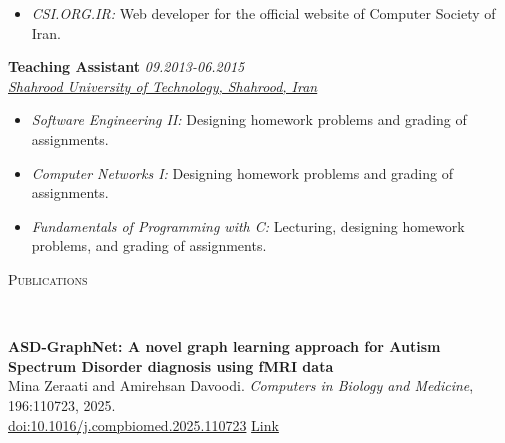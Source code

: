 \documentclass[9pt]{article}
\newenvironment{changemargin}[2]{%
  \begin{list}{}{%
    \setlength{\topsep}{0pt}%
    \setlength{\leftmargin}{#1}%
    \setlength{\rightmargin}{#2}%
    \setlength{\listparindent}{\parindent}%
    \setlength{\itemindent}{\parindent}%
    \setlength{\parsep}{\parskip}%
  }%
  \item[]}{\end{list}
}
\newcommand{\lineover}{
	\begin{changemargin}{-0.05in}{-0.05in}
		\vspace*{-8pt}
		\hrulefill \\
		\vspace*{-2pt}
	\end{changemargin}
}
\newcommand{\header}[1]{
	\begin{changemargin}{-0.5in}{-0.5in}
		\scshape{#1}\\
  	\lineover
	\end{changemargin}
}
\newenvironment{body} {
	\vspace*{-16pt}
	\begin{changemargin}{-0.25in}{-0.5in}
  }	
	{\end{changemargin}
}
\begin{document}
\begin{body}
\begin{itemize}
		\item \emph{CSI.ORG.IR:} Web developer for the official website of Computer Society of Iran.
	\end{itemize}

	\vspace{5pt}

	\textbf{Teaching Assistant} \hfill \emph{09.2013-06.2015} \\
	\href{http://www.shahroodut.ac.ir/fa/?lng=en}{\emph{Shahrood University of Technology, Shahrood, Iran}} \\
	\begin{itemize}
		\item \emph{Software Engineering II:} Designing homework problems and grading of assignments.

		\item \emph{Computer Networks I:} Designing homework problems and grading of assignments.

		\item \emph{Fundamentals of Programming with C:} Lecturing, designing homework problems, and grading of assignments.
	\end{itemize}

\end{body}

\header{Publications}
\begin{body}
	\vspace{14pt}
	\textbf{ASD-GraphNet: A novel graph learning approach for Autism Spectrum Disorder diagnosis using fMRI data} \\
	Mina Zeraati and Amirehsan Davoodi. \emph{Computers in Biology and Medicine}, 196:110723, 2025.\\
	\href{https://doi.org/10.1016/j.compbiomed.2025.110723}{doi:10.1016/j.compbiomed.2025.110723} \hfill \href{https://www.sciencedirect.com/science/article/pii/S0010482525010741}{Link} \\
\end{body}
\end{document}
